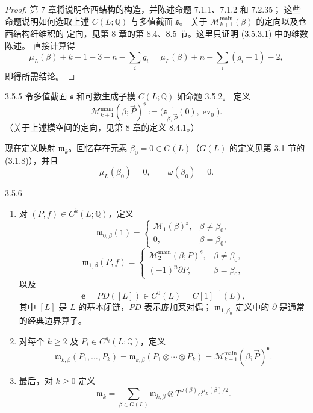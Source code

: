\begin{proof}
第 7 章将说明仓西结构的构造，并陈述命题 7.1.1、7.1.2 和 7.2.35；
这些命题说明如何选取上述 $C(L;\mathbb Q)$ 与多值截面 $\mathfrak s$。
关于 $\mathcal M_{k+1}^{\mathrm{main}}(\beta)$ 的定向以及仓西结构纤维积的
定向，见第 8 章的第 8.4、8.5 节。这里只证明 (3.5.3.1) 中的维数陈述。
直接计算得
\[
  \mu_L(\beta)+k+1-3+n-\sum_i g_i
  =\mu_L(\beta)+n-\sum_i(g_i-1)-2,
\]
即得所需结论。
\end{proof}

\begin{definition}{3.5.5}\label{def:3-5-5}
令多值截面 $\mathfrak s$ 和可数生成子模 $C(L;\mathbb Q)$ 如命题 3.5.2。
定义
\[
  \mathcal M_{k+1}^{\mathrm{main}}(\beta;\vec P)^{\mathfrak s}
  :=\bigl(\mathfrak s_{\beta,\vec P}^{-1}(0),
  \operatorname{ev}_0\bigr).
\]
（关于上述模空间的定向，见第 8 章的定义 8.4.1。）
\end{definition}

现在定义映射 $\mathfrak m_k$。回忆存在元素
$\beta_0=0\in G(L)$（$G(L)$ 的定义见第 3.1 节的 (3.1.8)），并且
\[
  \mu_L(\beta_0)=0,\qquad \omega(\beta_0)=0.
\]

\begin{definition}{3.5.6}\label{def:3-5-6}
\begin{enumerate}[label=\textup{(\arabic*)},leftmargin=2.8em]
  \item 对 $(P,f)\in C^k(L;\mathbb Q)$，定义
  \[
    \mathfrak m_{0,\beta}(1)=
    \begin{cases}
      \mathcal M_1(\beta)^{\mathfrak s},
        &\beta\ne\beta_0,\\
      0,&\beta=\beta_0,
    \end{cases}
  \]
  \[
    \mathfrak m_{1,\beta}(P,f)=
    \begin{cases}
      \mathcal M_2^{\mathrm{main}}(\beta;P)^{\mathfrak s},
        &\beta\ne\beta_0,\\
      (-1)^n\partial P,&\beta=\beta_0,
    \end{cases}
  \]
  以及
  \[
    \mathbf e=PD([L])\in C^0(L)=C[1]^{-1}(L),
  \]
  其中 $[L]$ 是 $L$ 的基本闭链，$PD$ 表示庞加莱对偶；
  $\mathfrak m_{1,\beta_0}$ 定义中的 $\partial$ 是通常的经典边界算子。

  \item 对每个 $k\geq2$ 及 $P_i\in C^{g_i}(L;\mathbb Q)$，定义
  \[
    \mathfrak m_{k,\beta}(P_1,\ldots,P_k)
    =\mathfrak m_{k,\beta}(P_1\otimes\cdots\otimes P_k)
    =\mathcal M_{k+1}^{\mathrm{main}}
      (\beta;\vec P)^{\mathfrak s}.
  \]

  \item 最后，对 $k\geq0$ 定义
  \begin{equation}
    \mathfrak m_k
    =\sum_{\beta\in G(L)}
    \mathfrak m_{k,\beta}\otimes
    T^{\omega(\beta)}e^{\mu_L(\beta)/2}.
    \tag{3.5.7}\label{eq:3-5-7}
  \end{equation}
\end{enumerate}
\end{definition}

